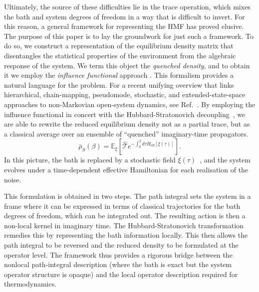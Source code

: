 ﻿\documentclass[aps,prl,twocolumn,superscriptaddress,showpacs,floatfix]{revtex4-2}
\begin{document}
Ultimately, the source of these difficulties lie in the trace operation, which mixes the bath and system degrees of freedom in a way that is difficult to invert. For this reason, a general framework for representing the HMF has proved elusive. The purpose of this paper is to lay the groundwork for just such a framework. To do so, we construct a representation of the equilibrium density matrix that disentangles the statistical properties of the environment from the algebraic response of the system. We term this object the \emph{quenched density}, and to obtain it we employ the \emph{influence functional} approach \cite{feynmanTheoryGeneralQuantum1963a,caldeiraQuantumTunnellingDissipative1983a,grabertQuantumBrownianMotion1988}. This formalism provides a natural language for the problem. For a recent unifying overview that links hierarchical, chain-mapping, pseudomode, stochastic, and extended-state-space approaches to non-Markovian open-system dynamics, see Ref.~\cite{XuVadimovStockburgerAnkerhold2026}. By employing the influence functional in concert with the Hubbard-Stratonovich decoupling~\cite{hubbardCalculationPartitionFunctions1959a,stratonovich1957QDistro,stockburgerExactNumberRepresentation2002}, we are able to rewrite the reduced equilibrium density not as a partial trace, but as a classical average over an ensemble of ``quenched'' imaginary-time propagators.
\begin{equation}
    \bar{\rho}_S(\beta) = \mathbb{E}_{\xi}\left[ \hat{\mathcal{T}} e^{-\int_0^\beta d\tau H_{\mathrm{eff}}[\xi(\tau)]} \right].
\end{equation}
In this picture, the bath is replaced by a stochastic field $\xi(\tau)$~\cite{stockburgerSimulatingSpinbosonDynamics2004,mccaulPartitionfreeApproachOpen2017c,wiedmannNonMarkovianDynamicsQuantum2020,laneExactlyThermalizedQuantum2020,matosEfficientChoiceColored2020,matosStochasticEntropyProduction2022}, and the system evolves under a time-dependent effective Hamiltonian for each realisation of the noise.

This formulation is obtained in two steps. The path integral sets the system in a frame where it can be expressed in terms of classical trajectories for the bath degrees of freedom, which can be integrated out. The resulting action is then a non-local kernel in imaginary time. The Hubbard-Stratonovich transformation remedies this by representing the bath information locally. This then allows the path integral to be reversed and the reduced density to be formulated at the operator level. The framework thus provides a rigorous bridge between the nonlocal path-integral description (where the bath is exact but the system operator structure is opaque) and the local operator description required for thermodynamics.
\end{document}

